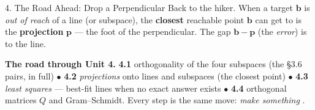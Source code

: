 \documentclass[10pt]{article}
\newcommand{\bb}{\mathbf{b}}
\newcommand{\pp}{\mathbf{p}}
\begin{document}
\begin{notesbox}{4. The Road Ahead: Drop a Perpendicular}
Back to the hiker. When a target $\bb$ is \emph{out of reach} of a line (or subspace), the
\textbf{closest} reachable point $\bb$ can get to is the \textbf{projection} $\pp$ --- the foot of
the perpendicular. The gap $\bb-\pp$ (the \emph{error}) is  to the line.

\begin{center}
\end{center}

\textbf{The road through Unit 4.} \textbf{4.1} orthogonality of the four subspaces (the §3.6 pairs,
in full)\; $\bullet$\; \textbf{4.2} \emph{projections} onto lines and subspaces (the closest
point)\; $\bullet$\; \textbf{4.3} \emph{least squares} --- best-fit lines when no exact answer
exists\; $\bullet$\; \textbf{4.4} orthogonal matrices $Q$ and Gram--Schmidt. Every step is the same
move: \emph{make something} .
\end{notesbox}
\end{document}
